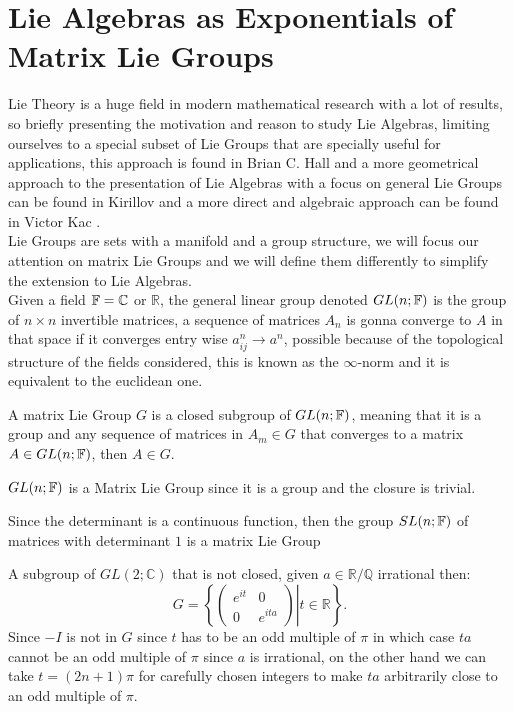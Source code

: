 \section{Lie Algebras as Exponentials of Matrix Lie Groups}
Lie Theory is a huge field in modern mathematical research with a lot of results, so briefly presenting the motivation and reason to study Lie Algebras, limiting ourselves to a special subset of Lie Groups that are specially useful for applications, this approach is found in Brian C. Hall\cite{brian} and a more geometrical approach to the presentation of Lie Algebras with a focus on general Lie Groups can be found in Kirillov\cite{kirillov} and a more direct and algebraic approach can be found in Victor Kac \cite{kaclec}.\\
Lie Groups are sets with a manifold and a group structure, we will focus our attention on matrix Lie Groups and we will define them differently to simplify the extension to Lie Algebras.\\
Given a field $\mathbb{F}=\mathbb{C}$ or $\mathbb{R}$, the general linear group denoted $GL(n;\mathbb{F})$ is the group of $n\times n$ invertible matrices, a sequence of matrices $A_n$ is gonna converge to $A$ in that space if it converges entry wise $a^n_{ij} \rightarrow a^n$, possible because of the topological structure of the fields considered, this is known as the $\infty$-norm and it is equivalent to the euclidean one.
\begin{defi}
	A matrix Lie Group $G$ is a closed subgroup of $GL(n;\mathbb{F})$, meaning that it is a group and any sequence of matrices in $A_m \in G$ that converges to a matrix $A \in GL(n;\mathbb{F})$, then $A \in G$.
	\label{MATRIXLIEGROUPDEF}
\end{defi}
\begin{ex}
	$GL(n;\mathbb{F})$ is a Matrix Lie Group since it is a group and the closure is trivial.
\end{ex}
\begin{ex}
Since the determinant is a continuous function, then the group $SL(n;\mathbb{F})$ of matrices with determinant $1$ is a matrix Lie Group
\end{ex}
\begin{ex}A subgroup of $GL(2;\mathbb{C})$ that is not closed, given $a\in \mathbb{R}/\mathbb{Q}$ irrational then:
		$$G=\left\{\left.\begin{pmatrix}
		e^{it} & 0 \\
		0 & e^{ita}	\end{pmatrix} \right| t \in \mathbb{R}\right\}.$$
		Since $-I$ is not in $G$ since $t$ has to be an odd multiple of $\pi$ in which case $ta$ cannot be an odd multiple of $\pi$ since $a$ is irrational, on the other hand we can take $t=(2n+1)\pi$ for carefully chosen integers to make $ta$ arbitrarily close to an odd multiple of $\pi$.\\
\end{ex}
